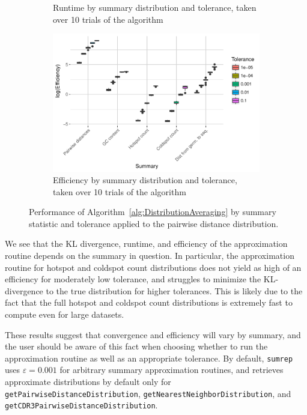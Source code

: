 \documentclass{article}
\begin{document}
\begin{figure}
\begin{subfigure}{0.49\textwidth}
        \caption{Runtime by summary distribution and tolerance, taken over 10 trials of the algorithm}
        \label{fig:TimeBySummary}
    \end{subfigure}
    \begin{subfigure}{0.49\textwidth}
        \includegraphics[width=\linewidth]{Figures/Multiple/efficiency_by_summary_and_tol.pdf}
        \caption{Efficiency by summary distribution and tolerance, taken over 10 trials of the algorithm}
        \label{fig:EfficiencyBySummary}
    \end{subfigure}
    \caption{Performance of Algorithm~\ref{alg:DistributionAveraging} by summary statistic and tolerance applied to the pairwise distance distribution.}
\end{figure}
We see that the KL divergence, runtime, and efficiency of the approximation routine depends on the summary in question.
In particular, the approximation routine for hotspot and coldspot count distributions does not yield as high of an efficiency for moderately low tolerance, and struggles to minimize the KL-divergence to the true distribution for higher tolerances.
This is likely due to the fact that the full hotspot and coldspot count distributions is extremely fast to compute even for large datasets.

These results suggest that convergence and efficiency will vary by summary, and the user should be aware of this fact when choosing whether to run the approximation routine as well as an appropriate tolerance.
By default, \texttt{sumrep} uses $\varepsilon = 0.001$ for arbitrary summary approximation routines, and retrieves approximate distributions by default only for \texttt{getPairwiseDistanceDistribution}, \texttt{getNearestNeighborDistribution}, and \texttt{getCDR3PairwiseDistanceDistribution}.
\end{document}
